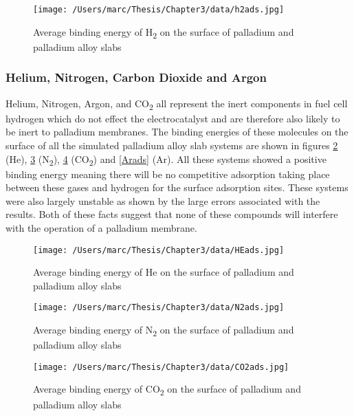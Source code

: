 \begin{landscape}
\begin{figure}
    \centering
    \texttt{[image: /Users/marc/Thesis/Chapter3/data/h2ads.jpg]}
    \caption{Average binding energy of H\textsubscript{2} on the surface of palladium and palladium alloy slabs}
    \label{h2ads}
  \end{figure}

\end{landscape}
\subsubsection{Helium, Nitrogen, Carbon Dioxide and Argon}
Helium, Nitrogen, Argon, and CO\textsubscript{2} all represent the inert components in fuel cell hydrogen which do not effect the electrocatalyst and are therefore also likely to be inert to palladium membranes. The binding energies of these molecules on the surface of all the simulated palladium alloy slab systems are shown in figures \ref{heads} (He), \ref{n2ads} (N\textsubscript{2}), \ref{co2ads} (CO\textsubscript{2}) and \ref{Arads} (Ar). All these systems showed a positive binding energy meaning there will be no competitive adsorption taking place between these gases and hydrogen for the surface adsorption sites. These systems were also largely unstable as shown by the large errors associated with the results. Both of these facts suggest that none of these compounds will interfere with the operation of a palladium membrane.

\begin{figure}
  \centering
  \texttt{[image: /Users/marc/Thesis/Chapter3/data/HEads.jpg]}
  \caption{Average binding energy of He on the surface of palladium and palladium alloy slabs}
  \label{heads}

\end{figure}

    \begin{figure}
        \centering
        \texttt{[image: /Users/marc/Thesis/Chapter3/data/N2ads.jpg]}
        \caption{Average binding energy of N\textsubscript{2} on the surface of palladium and palladium alloy slabs}
        \label{n2ads}
      \end{figure}

    \begin{figure}
        \centering
        \texttt{[image: /Users/marc/Thesis/Chapter3/data/CO2ads.jpg]}
        \caption{Average binding energy of CO\textsubscript{2} on the surface of palladium and palladium alloy slabs}
        \label{co2ads}
      \end{figure}
    
